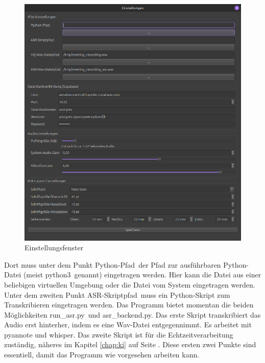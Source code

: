 \begin{figure}
    \centering
    \includegraphics[width=0.7\linewidth]{Bilder/Einstellungen}
    \caption[Einstellungsfenster]{Einstellungsfenster}
    \label{pic:Settings}
\end{figure}


Dort muss unter dem Punkt \glqq Python-Pfad\grqq\ der Pfad zur ausführbaren Python-Datei (meist \glqq python3\grqq\ genannt) eingetragen werden. Hier kann die Datei aus einer beliebigen virtuellen Umgebung oder die Datei vom System eingetragen werden. Unter dem zweiten Punkt \glqq ASR-Skriptpfad\grqq\ muss ein Python-Skript zum Transkribieren eingetragen werden. Das Programm bietet momentan die beiden Möglichkeiten \glqq run\_asr.py\grqq\ und \glqq asr\_backend.py\grqq. Das erste Skript transkribiert das Audio erst hinterher, indem es eine Wav-Datei entgegennimmt. Es arbeitet mit pyannote und whisper. Das zweite Skript ist für die Echtzeitverarbeitung zuständig, näheres im Kapitel \ref{chap:ki} auf Seite \pageref{chap:ki}. Diese ersten zwei Punkte sind essentiell, damit das Programm wie vorgesehen arbeiten kann.

